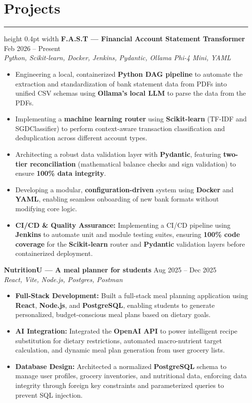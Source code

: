 \documentclass[letterpaper,9pt]{article}
\begin{document}
\section*{Projects}
\hrule height 0.4pt width \textwidth \vspace{2pt}
\textbf{F.A.S.T — Financial Account Statement Transformer} \hfill Feb 2026 -- Present \\
\textit{Python, Scikit-learn, Docker, Jenkins, Pydantic, Ollama Phi-4 Mini, YAML}
\begin{itemize}[leftmargin=*, noitemsep, topsep=2pt, parsep=0pt]
    \item Engineering a local, containerized \textbf{Python DAG pipeline} to automate the extraction and standardization of bank statement data from PDFs into unified CSV schemas using \textbf{Ollama's local LLM} to parse the data from the PDFs.
    \item Implementing a \textbf{machine learning router} using \textbf{Scikit-learn} (TF-IDF and SGDClassifier) to perform context-aware transaction classification and deduplication across different account types.
    \item Architecting a robust data validation layer with \textbf{Pydantic}, featuring \textbf{two-tier reconciliation} (mathematical balance checks and sign validation) to ensure \textbf{100\% data integrity}.
    \item Developing a modular, \textbf{configuration-driven} system using \textbf{Docker} and \textbf{YAML}, enabling seamless onboarding of new bank formats without modifying core logic.
    \item \textbf{CI/CD \& Quality Assurance:} Implementing a CI/CD pipeline using \textbf{Jenkins} to automate unit and module testing suites, ensuring \textbf{100\% code coverage} for the \textbf{Scikit-learn} router and \textbf{Pydantic} validation layers before containerized deployment.
\end{itemize}

\vspace{2pt}
\textbf{NutritionU — A meal planner for students} \hfill Aug 2025 -- Dec 2025 \\
\textit{React, Vite, Node.js, Postgres, Postman}
\begin{itemize}[leftmargin=*, noitemsep, topsep=2pt, parsep=0pt]
    \item \textbf{Full-Stack Development:} Built a full-stack meal planning application using \textbf{React}, \textbf{Node.js}, and \textbf{PostgreSQL}, enabling students to generate personalized, budget-conscious meal plans based on dietary goals.
    \item \textbf{AI Integration:} Integrated the \textbf{OpenAI API} to power intelligent recipe substitution for dietary restrictions, automated macro-nutrient target calculation, and dynamic meal plan generation from user grocery lists.
    \item \textbf{Database Design:} Architected a normalized \textbf{PostgreSQL} schema to manage user profiles, grocery inventories, and nutritional data, enforcing data integrity through foreign key constraints and parameterized queries to prevent SQL injection.
\end{itemize}
\end{document}

